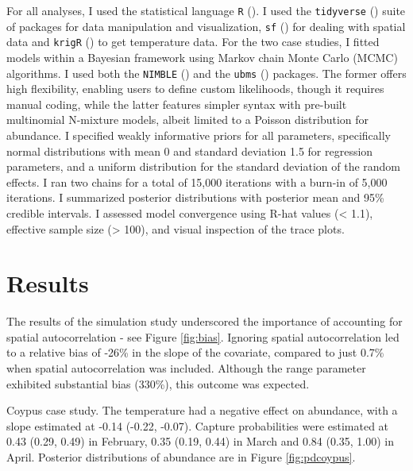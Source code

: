 \documentclass[
  11pt,
  a4paper,
]{article}
\begin{document}
For all analyses, I used the statistical language \texttt{R} (). I used the \texttt{tidyverse} () suite of packages for data manipulation and visualization, \texttt{sf} () for dealing with spatial data and \texttt{krigR} () to get temperature data. For the two case studies, I fitted models within a Bayesian framework using Markov chain Monte Carlo (MCMC) algorithms. I used both the \texttt{NIMBLE} () and the \texttt{ubms} () packages. The former offers high flexibility, enabling users to define custom likelihoods, though it requires manual coding, while the latter features simpler syntax with pre-built multinomial N-mixture models, albeit limited to a Poisson distribution for abundance. I specified weakly informative priors for all parameters, specifically normal distributions with mean 0 and standard deviation 1.5 for regression parameters, and a uniform distribution for the standard deviation of the random effects. I ran two chains for a total of 15,000 iterations with a burn-in of 5,000 iterations. I summarized posterior distributions with posterior mean and 95\% credible intervals. I assessed model convergence using R-hat values (\textless{} 1.1), effective sample size (\textgreater{} 100), and visual inspection of the trace plots.

\section{Results}\label{results}

The results of the simulation study underscored the importance of accounting for spatial autocorrelation - see Figure \ref{fig:bias}. Ignoring spatial autocorrelation led to a relative bias of -26\% in the slope of the covariate, compared to just 0.7\% when spatial autocorrelation was included. Although the range parameter exhibited substantial bias (330\%), this outcome was expected.

Coypus case study. The temperature had a negative effect on abundance, with a slope estimated at -0.14 (-0.22, -0.07). Capture probabilities were estimated at 0.43 (0.29, 0.49) in February, 0.35 (0.19, 0.44) in March and 0.84 (0.35, 1.00) in April. Posterior distributions of abundance are in Figure \ref{fig:pdcoypus}.
\end{document}
